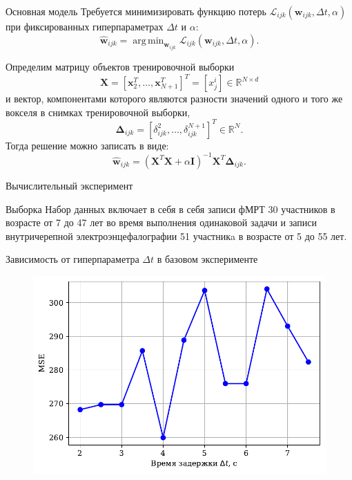 \documentclass[9pt,pdf]{beamer} %
\DeclareMathOperator*{\argmin}{arg\,min}  %
\begin{document}
\begin{frame}{Основная модель}
Требуется минимизировать функцию потерь $\mathcal{L}_{ijk}(\bm{w}_{ijk}, \Delta t, \alpha)$ при фиксированных гиперпараметрах $\Delta t$ и $\alpha$:
\begin{equation}
	\label{main_Problem}
	\hat{\bm{w}}_{ijk} = \argmin_{\bm{w}_{ijk}} \mathcal{L}_{ijk}(\bm{w}_{ijk}, \Delta t, \alpha).
\end{equation}

Определим матрицу объектов тренировочной выборки
\begin{equation}
\label{X}
    \bm{X} = [\bm{x}_2^T, \dots, \bm{x}_{N+1}^T]^T = [x^i_j] \in \mathbb{R}^{N \times d}
\end{equation}
и вектор, компонентами которого являются разности значений одного и того же вокселя в снимках тренировочной выборки,
\begin{equation}
\label{Delta}
    \bm{\Delta}_{ijk} = [\delta^{2}_{ijk}, \dots, \delta^{N+1}_{ijk}]^T \in \mathbb{R}^{N}.
\end{equation}
Тогда решение можно записать в виде:
\begin{equation}
\label{weights}
    \hat{\bm{w}}_{ijk} = (\bm{X}^T \bm{X} + \alpha \mathbf{I})^{-1} \bm{X}^T \bm{\Delta}_{ijk}.
\end{equation}

\end{frame}
\begin{frame}{Вычислительный эксперимент}
\begin{block}{Выборка} 
Набор данных включает в себя в себя записи фМРТ 30 участников в возрасте от 7 до 47 лет во время выполнения одинаковой задачи и записи внутричерепной электроэнцефалографии 51 участникa в возрасте от 5 до 55 лет. 
\end{block}
\begin{block}{Зависимость от гиперпараметра $\Delta t$ в базовом эксперименте}
\begin{figure}[h!]
    \centering
    \includegraphics[scale = 0.34]{MSE_dt.pdf}
    \label{MSE_dt}
\end{figure}
\end{block}
\end{frame}
\end{document}
